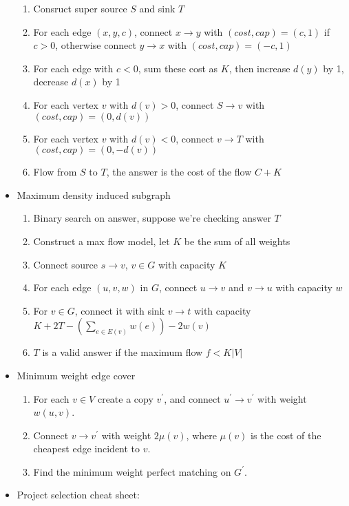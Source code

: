 \begin{itemize}
\begin{enumerate}
      \item Consruct super source $S$ and sink $T$
      \item For each edge $(x, y, c)$, connect $x \rightarrow y$ with $(cost, cap) = (c, 1)$ if $c > 0$, otherwise connect $y \rightarrow x$ with $(cost, cap) = (-c, 1)$
      \item For each edge with $c < 0$, sum these cost as $K$, then increase $d(y)$ by 1, decrease $d(x)$ by 1
      \item For each vertex $v$ with $d(v) > 0$, connect $S \rightarrow v$ with $(cost, cap) = (0, d(v))$
      \item For each vertex $v$ with $d(v) < 0$, connect $v \rightarrow T$ with $(cost, cap) = (0, -d(v))$
      \item Flow from $S$ to $T$, the answer is the cost of the flow $C + K$
    \end{enumerate}
  \item Maximum density induced subgraph
    \begin{enumerate}
      \item Binary search on answer, suppose we're checking answer $T$
      \item Construct a max flow model, let $K$ be the sum of all weights
      \item Connect source $s \rightarrow v$, $v \in G$ with capacity $K$
      \item For each edge $(u, v, w)$ in $G$, connect $u \rightarrow v$ and $v \rightarrow u$ with capacity $w$
      \item For $v \in G$, connect it with sink $v \rightarrow t$ with capacity $K + 2T - \left(\sum_{e \in E(v)}{w(e)}\right) - 2w(v)$
      \item $T$ is a valid answer if the maximum flow $f < K \lvert V \rvert$
    \end{enumerate}
  \item Minimum weight edge cover
    \begin{enumerate}
      \item For each $v \in V$ create a copy $v^\prime$, and connect $u^\prime \to v^\prime$ with weight $w(u, v)$.
      \item Connect $v \to v^\prime$ with weight $2\mu(v)$, where $\mu(v)$ is the cost of the cheapest edge incident to $v$.
      \item Find the minimum weight perfect matching on $G^\prime$.
    \end{enumerate}
  \item Project selection cheat sheet:

\end{itemize}
